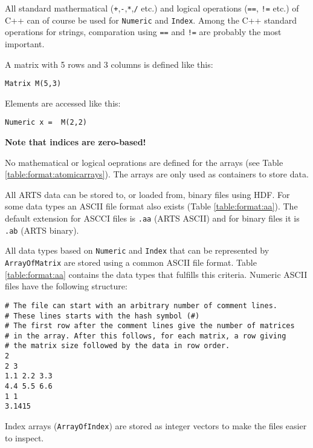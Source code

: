 All standard mathermatical (\verb|+|,\verb|-|,\verb|*|,\verb|/| etc.)
and logical operations (\verb|==|, \verb|!=| etc.) of C++ can of
course be used for \verb|Numeric| and \verb|Index|. Among the C++
standard operations for strings, comparation using \verb|==| and
\verb|!=| are probably the most important.

 
 
A matrix with 5 rows and 3 columns is defined like this:
\begin{verbatim}
Matrix M(5,3)
\end{verbatim}
Elements are accessed like this:
\begin{verbatim}
Numeric x =  M(2,2)
\end{verbatim}
\textbf{Note that indices are zero-based!}


 
 No mathematical or logical oeprations are defined for the arrays (see
 Table \ref{table:format:atomicarrays}). The arrays are only used as
 containers to store data.


 \label{sec:formats:files}
 
 All ARTS data can be stored to, or loaded from, binary files using
 HDF.  For some data types an ASCII file format also exists (Table
 \ref{table:format:aa}). The default extension for ASCCI files is
 \verb|.aa| (ARTS ASCII) and for binary files it is \verb|.ab| (ARTS
 binary).
 
  \label{sec:formats:file:ascii}
  
  All data types based on \verb|Numeric| and \verb|Index| that can be
  represented by \verb|ArrayOfMatrix| are stored using a common ASCII
  file format. Table \ref{table:format:aa} contains the data types that
  fulfills this criteria. Numeric ASCII files have the following 
  structure: \\
  {\footnotesize \begin{verbatim} 
# The file can start with an arbitrary number of comment lines.  
# These lines starts with the hash symbol (#) 
# The first row after the comment lines give the number of matrices 
# in the array. After this follows, for each matrix, a row giving 
# the matrix size followed by the data in row order.  
2 
2 3 
1.1 2.2 3.3 
4.4 5.5 6.6 
1 1 
3.1415
 \end{verbatim} 
}

 \noindent
 Index arrays (\verb|ArrayOfIndex|) are stored as integer vectors to
 make the files easier to inspect.
     
